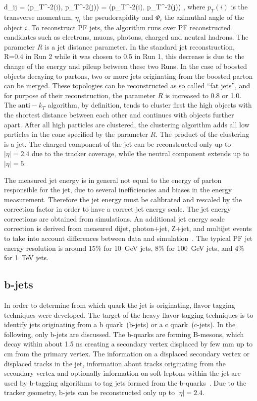 {   
    d_{ij} = \left({p_{T}}^{-2}(i), {p_{T}}^{-2}(j)\right)  =  ({p_{T}}^{-2}(i), {p_{T}}^{-2}(j)) ,
}
where $p_{T}(i)$ is the transverse momentum, $\eta_{i}$  the pseudorapidity and $\Phi_{i}$ the azimuthal angle of the object $i$. To reconstruct PF jets, the algorithm runs over PF reconstructed candidates such as electrons, muons, photons, charged and neutral hadrons. The parameter $R$ is a jet distance parameter. In the standard jet reconstruction, R=0.4  in Run 2 while it was chosen to 0.5 in Run 1, this decrease is due to the change of the energy and pileup between these two Runs. In the case of boosted objects decaying to partons, two or more jets originating from the boosted parton can be merged. These topologies can be reconstructed as so called ``fat jets'', and for purpose of their reconstruction, the parameter $R$ is increased to 0.8 or 1.0. The $\mathrm{anti-}k_{T}$ algorithm, by definition, tends to cluster first the high \pt objects with the shortest distance between each other and continues with objects further apart. After all high \pt particles are clustered, the clustering algorithm adds all low \pt particles in the cone specified by the parameter $R$. The product of the clustering is a jet. The charged component of the jet can be reconstructed only up to $|\eta|=2.4$ due to the tracker coverage, while the neutral component extends up to  $|\eta|=5$.

The measured jet energy is in general not equal to the energy of parton responsible for the jet, due to several inefficiencies and biases in the energy measurement. Therefore the jet energy must be calibrated and rescaled by the correction factor in order to have a correct jet energy scale. The jet energy corrections are obtained from simulations. An additional jet energy scale correction is derived from measured dijet, photon+jet, Z+jet, and multijet events to take into account differences between data and simulation~\cite{Khachatryan:2016kdb}. The typical PF jet energy resolution is around 15\% for 10~GeV jets, 8\% for 100~GeV jets, and 4\% for 1~TeV jets. %

\subsection{b-jets}

In order to determine from which quark the jet is originating, flavor tagging techniques were developed. The target of the heavy flavor tagging techniques is to identify jets originating from a b quark~(b-jets) or a c quark~(c-jets). In the following, only b-jets are discussed. The b-quarks are forming B-mesons, which decay within about 1.5 ns creating a secondary vertex  displaced by few mm up to cm from the primary vertex. The information on a displaced secondary vertex or displaced tracks in the jet, information about tracks originating from the secondary vertex and optionally information on soft leptons within the jet are used by b-tagging algorithms to tag jets formed from the b-quarks~\cite{Sirunyan:2017ezt}. Due to the tracker geometry, b-jets can be reconstructed only up to $|\eta|=2.4$.


